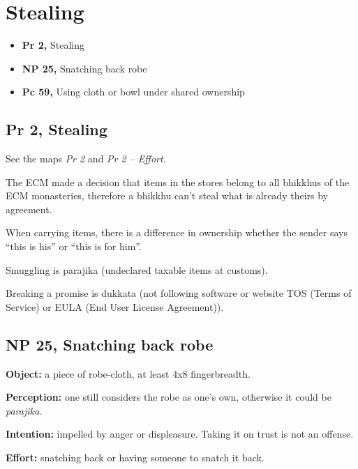 \chapter{Stealing}

\begin{itemize}
\tightlist
\item
  \textbf{Pr 2,} Stealing
\item
  \textbf{NP 25,} Snatching back robe
\item
  \textbf{Pc 59,} Using cloth or bowl under shared ownership
\end{itemize}

\enlargethispage*{4\baselineskip}
\par
{}
\par
\vspace*{-2\baselineskip}

\section{Pr 2, Stealing}

See the maps \emph{Pr 2} and \emph{Pr 2 -- Effort}.

The ECM made a decision that items in the stores belong to all bhikkhus
of the ECM monasteries, therefore a bhikkhu can't steal what is already
theirs by agreement.

When carrying items, there is a difference in ownership whether the
sender says ``this is his'' or ``this is for him''.

Smuggling is parajika (undeclared taxable items at customs).

Breaking a promise is dukkata (not following software or website TOS
(Terms of Service) or EULA (End User License Agreement)).

\section{NP 25, Snatching back robe}

\textbf{Object:} a piece of robe-cloth, at least 4x8 fingerbreadth.

\textbf{Perception:} one still considers the robe as one's own,
otherwise it could be \emph{parajika}.

\textbf{Intention:} impelled by anger or displeasure. Taking it on trust
is not an offense.

\textbf{Effort:} snatching back or having someone to snatch it back.

